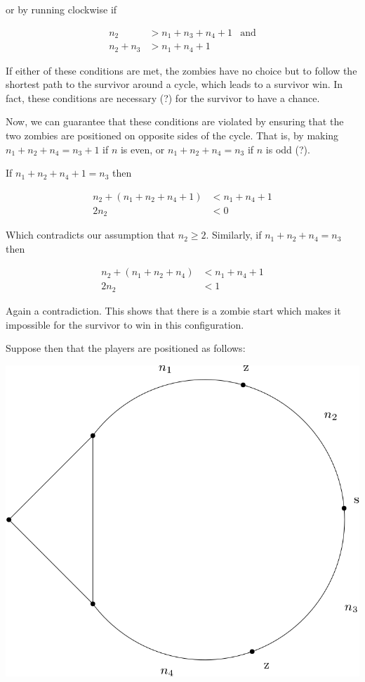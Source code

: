 \documentclass[letterpaper, 10pt]{article}
\begin{document}
\begin{enumerate}
or by running clockwise if

\begin{align*}
  n_2 & > n_1 + n_3 + n_4 + 1 & \text{and}\\
  n_2 + n_3 & > n_1 + n_4 + 1
\end{align*}

If either of these conditions are met, the zombies have no choice but to follow the shortest path to the
survivor around a cycle, which leads to a survivor win. In fact, these conditions are necessary (?) for the
survivor to have a chance.

Now, we can guarantee that these conditions are violated by ensuring that the two zombies are positioned
on opposite sides of the cycle. That is, by making $n_1 + n_2 + n_4 = n_3 + 1$ if $n$ is even, or
$n_1 + n_2 + n_4 = n_3 $ if $n$ is odd (?).

If $n_1 + n_2 + n_4 +1 = n_3$ then

\begin{align*}
  n_2 + (n_1 + n_2 + n_4 + 1) & < n_1 + n_4 + 1 \\
  2 n_2 & < 0
\end{align*}

Which contradicts our assumption that $n_2 \geq 2$. Similarly, if $n_1 + n_2 + n_4 = n_3$ then

\begin{align*}
  n_2 + (n_1 + n_2 + n_4) & < n_1 + n_4 + 1 \\
  2 n_2 & < 1
\end{align*}

Again a contradiction. This shows that there is a zombie start which makes it impossible for the survivor
to win in this configuration.

Suppose then that the players are positioned as follows:

\begin{center}
  \includegraphics[scale=0.25]{bifurcated_cycle_2_n_type_B.png}
\end{center}


\end{enumerate}
\end{document}
